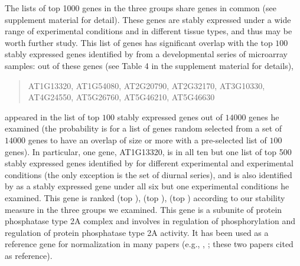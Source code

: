 		The lists of top 1000 genes in the three groups share \overlapGene genes in common (see supplement material for detail).  These
		genes are stably expressed under a wide range of experimental conditions and
		in different tissue types, and thus may be worth further study. This list of
		\overlapGene genes has significant overlap with the top $100$ stably expressed genes
		identified by \cite{czechowski2005genome} from a developmental series of
		microarray samples: \overlapGeneCze out of these \overlapGene genes (see Table 4 in the
		supplement material for details),
		\begin{center}
			\begin{quote}
				AT1G13320, AT1G54080, AT2G20790, AT2G32170, AT3G10330,\\
				AT4G24550, AT5G26760, AT5G46210, AT5G46630 \\
			\end{quote}
		\end{center}
		appeared in the list of top $100$ stably expressed genes
		out of $14000$ genes he examined (the probability is \overlapProb for
		a list of \overlapGene genes random selected from a set of $14000$ genes to have an
		overlap of size \overlapGeneCze or more with a pre-selected list of $100$ genes). In
		particular, one gene, AT1G13320, is in all ten but one list of top 500 stably
		expressed genes identified by \cite{czechowski2005genome} for different
		experimental and experimental conditions (the only exception is the set of
		diurnal series), and is also identified by
		\cite{hong2010identification} as a stably expressed gene under all six but one
		experimental conditions he examined.  This gene is ranked \rankInSeedling (top \rankTopPctSeedling), \rankInLeaf
		(top \rankTopPctLeaf), \rankInTissue (top \rankTopPctTissue) according to our stability measure in the three
		groups we examined.
		This gene is a subunite of protein phosphatase type 2A complex and involves in
		regulation of phosphorylation and regulation of protein phosphatase type 2A
		activity. It has been used as a reference gene for normalization in many
		papers (e.g., \cite{bournier2013arabidopsis}, \cite{baron2012transcriptional};
		these two papers cited \cite{czechowski2005genome} as reference). 
		

